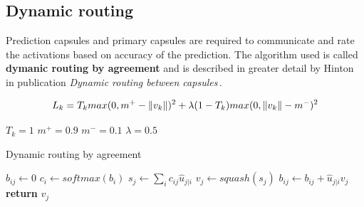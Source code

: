 \subsection{Dynamic routing}

Prediction capsules and primary capsules are required to communicate and rate the activations based on accuracy of the prediction. The algorithm used is called \textbf{dymanic routing by agreement} and is described in greater detail by Hinton in publication \textit{Dynamic routing between capsules}\,\cite{capsule}.




\begin{equation}
    L_k = T_k max(0, m^+ - \left\lVert v_k \right\rVert)^2 + \lambda (1 - T_k) max(0, \left\lVert v_k \right\rVert - m^-)^2 \\
\end{equation}

$T_k = 1$ $m^+ = 0.9$ $m^- = 0.1$ $\lambda = 0.5$

\begin{algorithm}[H]
    \caption{Dynamic routing by agreement}\label{alg:routing}
    \begin{algorithmic}[1]
         $b_{ij}\gets 0$ \EndFor
             $c_{i}\gets softmax(b_i)$ \EndFor
             $s_{j}\gets \sum_ic_{ij}\hat{u}_{j|i}$ \EndFor
             $v_{j}\gets squash(s_j)$ \EndFor
             $b_{ij}\gets b_{ij} + \hat{u}_{j|i} v_j$ \EndFor
        \EndFor
        \State \textbf{return} $v_j$
    \EndProcedure
    \end{algorithmic}
\end{algorithm}
